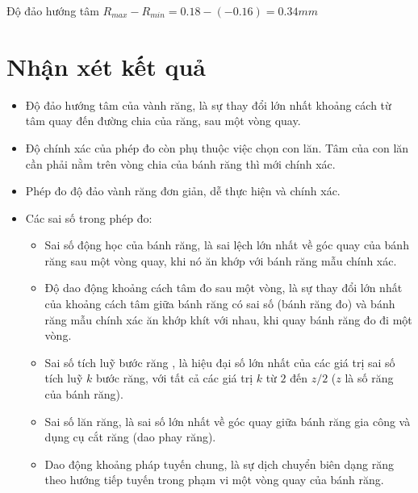 Độ đảo hướng tâm $ R_{max} - R_{min} = 0.18 - (-0.16) = 0.34 \unit{mm} $

\section{Nhận xét kết quả}
\begin{itemize}
	\item Độ đảo hướng tâm của vành răng, là sự thay đổi lớn nhất khoảng cách từ tâm quay đến đường chia của răng, sau một vòng quay.
	\item Độ chính xác của phép đo còn phụ thuộc việc chọn con lăn. Tâm của con lăn
	cần phải nằm trên vòng chia của bánh răng thì mới chính xác.
	\item Phép đo độ đảo vành răng đơn giản, dễ thực hiện và chính xác.
	\item Các sai số trong phép đo:
	\begin{itemize}
		\item Sai số động học của bánh răng, là sai lệch lớn nhất về góc quay của bánh răng sau một vòng quay, khi nó ăn khớp với bánh răng mẫu chính xác.
		\item Độ dao động khoảng cách tâm đo sau một vòng, là sự thay đổi lớn nhất của khoảng cách tâm giữa bánh răng có sai số (bánh răng đo) và bánh răng mẫu chính xác ăn khớp khít với nhau, khi quay bánh răng đo đi một vòng. 
		\item Sai số tích luỹ bước răng , là hiệu đại số lớn nhất của các giá trị sai số tích luỹ $ k $ bước răng, với tất cả các giá trị $ k $ từ $ 2 $ đến $ z/2 $ ($ z $ là số răng của bánh răng).
		\item Sai số lăn răng, là sai số lớn nhất về góc quay giữa bánh răng gia công và dụng cụ cắt răng (dao phay răng).
		\item Dao động khoảng pháp tuyến chung, là sự dịch chuyển biên dạng răng theo hướng tiếp tuyến trong phạm vi một vòng quay của bánh răng.
	\end{itemize}
\end{itemize}